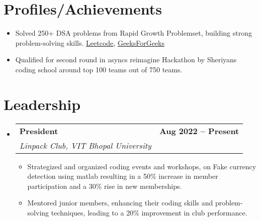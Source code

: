 \documentclass[letterpaper,10pt]{article}
\makeatletter
\newcommand{\resumeItem}[1]{
  \item\small{
    {#1 \vspace{-2pt}}
  }
}
\newcommand{\resumeSubheading}[4]{
  \vspace{-2pt}\item
    \begin{tabular*}{1.0\textwidth}[t]{l@{\extracolsep{\fill}}r}
      \textbf{#1} & \textbf{\small #2} \\
      \textit{\small#3} & \textit{\small #4} \\
    \end{tabular*}\vspace{-8pt}
}
\newcommand{\resumeItemListStart}{\begin{itemize}[leftmargin=*]}
\newcommand{\resumeItemListEnd}{\end{itemize}\vspace{-12pt}}
\newcommand{\resumeSubHeadingListStart}{\begin{itemize}[leftmargin=0.0in, label={}]}
\newcommand{\resumeSubHeadingListEnd}{\end{itemize}\vspace{-3pt}}
\makeatother
\begin{document}
\section{Profiles/Achievements}
\resumeItemListStart
\resumeItem{Solved 250+ DSA problems from Rapid Growth Problemset, building strong problem-solving skills. \href{https://leetcode.com/u/coder_ayush_leet/}{Leetcode}, \href{https://www.geeksforgeeks.org/user/coder_ayush/}{GeeksForGeeks}}
\resumeItem{Qualified for second round in asyncs reimagine Hackathon by Sheriyans coding school around top 100 teams out of 750 teams.}
\resumeItemListEnd

\section{Leadership}
\resumeSubHeadingListStart
\resumeSubheading{President}{Aug 2022 – Present}{Linpack Club, VIT Bhopal University}{}
\resumeItemListStart
\resumeItem{Strategized and organized coding events and workshops, on Fake currency detection using matlab resulting in a 50\% increase in member participation and a 30\% rise in new memberships.}
\resumeItem{Mentored junior members, enhancing their coding skills and problem-solving techniques, leading to a 20\% improvement in club performance.}
\resumeItemListEnd
\resumeSubHeadingListEnd
\end{document}

